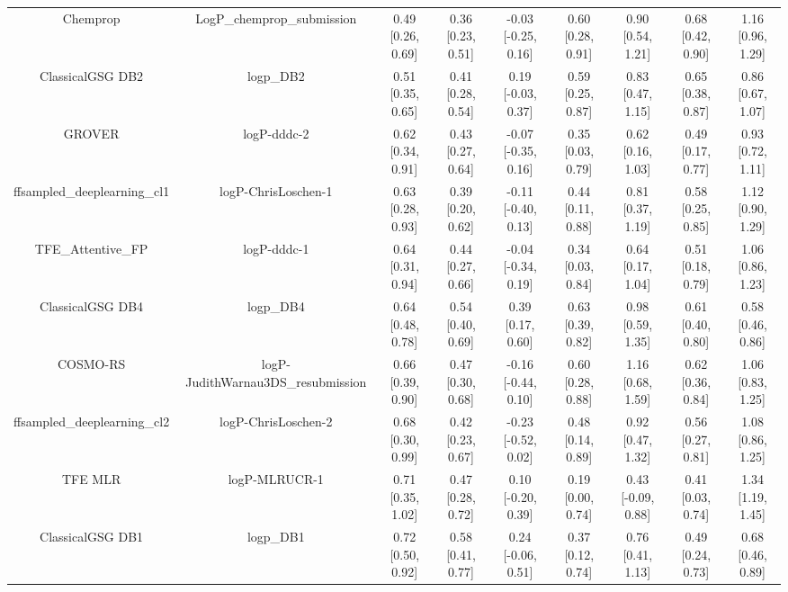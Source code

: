 \documentclass{article}
\begin{document}
\begin{center}
\begin{longtable}{|ccccccccc|}
\bottomrule
\endlastfoot
                    Chemprop &                    LogP\_chemprop\_submission & 0.49 [0.26, 0.69] & 0.36 [0.23, 0.51] &  -0.03 [-0.25, 0.16] & 0.60 [0.28, 0.91] &    0.90 [0.54, 1.21] &    0.68 [0.42, 0.90] &    1.16 [0.96, 1.29] \\
            ClassicalGSG DB2 &                                     logp\_DB2 & 0.51 [0.35, 0.65] & 0.41 [0.28, 0.54] &   0.19 [-0.03, 0.37] & 0.59 [0.25, 0.87] &    0.83 [0.47, 1.15] &    0.65 [0.38, 0.87] &    0.86 [0.67, 1.07] \\
                      GROVER &                                   logP-dddc-2 & 0.62 [0.34, 0.91] & 0.43 [0.27, 0.64] &  -0.07 [-0.35, 0.16] & 0.35 [0.03, 0.79] &    0.62 [0.16, 1.03] &    0.49 [0.17, 0.77] &    0.93 [0.72, 1.11] \\
  ffsampled_deeplearning_cl1 &                           logP-ChrisLoschen-1 & 0.63 [0.28, 0.93] & 0.39 [0.20, 0.62] &  -0.11 [-0.40, 0.13] & 0.44 [0.11, 0.88] &    0.81 [0.37, 1.19] &    0.58 [0.25, 0.85] &    1.12 [0.90, 1.29] \\
            TFE_Attentive_FP &                                   logP-dddc-1 & 0.64 [0.31, 0.94] & 0.44 [0.27, 0.66] &  -0.04 [-0.34, 0.19] & 0.34 [0.03, 0.84] &    0.64 [0.17, 1.04] &    0.51 [0.18, 0.79] &    1.06 [0.86, 1.23] \\
            ClassicalGSG DB4 &                                     logp\_DB4 & 0.64 [0.48, 0.78] & 0.54 [0.40, 0.69] &    0.39 [0.17, 0.60] & 0.63 [0.39, 0.82] &    0.98 [0.59, 1.35] &    0.61 [0.40, 0.80] &    0.58 [0.46, 0.86] \\
                    COSMO-RS &            logP-JudithWarnau3DS\_resubmission & 0.66 [0.39, 0.90] & 0.47 [0.30, 0.68] &  -0.16 [-0.44, 0.10] & 0.60 [0.28, 0.88] &    1.16 [0.68, 1.59] &    0.62 [0.36, 0.84] &    1.06 [0.83, 1.25] \\
  ffsampled_deeplearning_cl2 &                           logP-ChrisLoschen-2 & 0.68 [0.30, 0.99] & 0.42 [0.23, 0.67] &  -0.23 [-0.52, 0.02] & 0.48 [0.14, 0.89] &    0.92 [0.47, 1.32] &    0.56 [0.27, 0.81] &    1.08 [0.86, 1.25] \\
                     TFE MLR &                                 logP-MLRUCR-1 & 0.71 [0.35, 1.02] & 0.47 [0.28, 0.72] &   0.10 [-0.20, 0.39] & 0.19 [0.00, 0.74] &   0.43 [-0.09, 0.88] &    0.41 [0.03, 0.74] &    1.34 [1.19, 1.45] \\
            ClassicalGSG DB1 &                                     logp\_DB1 & 0.72 [0.50, 0.92] & 0.58 [0.41, 0.77] &   0.24 [-0.06, 0.51] & 0.37 [0.12, 0.74] &    0.76 [0.41, 1.13] &    0.49 [0.24, 0.73] &    0.68 [0.46, 0.89] \\

\end{longtable}
\end{center}
\end{document}
